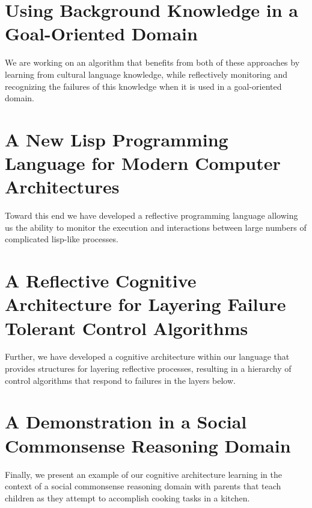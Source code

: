 \section{Using Background Knowledge in a Goal-Oriented Domain}

We are working on an algorithm that benefits from both of these
approaches by learning from cultural language knowledge, while
reflectively monitoring and recognizing the failures of this knowledge
when it is used in a goal-oriented domain.

\section{A New Lisp Programming Language for Modern Computer Architectures}

Toward this end we have developed a reflective programming language
allowing us the ability to monitor the execution and interactions
between large numbers of complicated lisp-like processes.

\section{A Reflective Cognitive Architecture for Layering Failure Tolerant Control Algorithms}

Further, we have developed a cognitive architecture within our
language that provides structures for layering reflective processes,
resulting in a hierarchy of control algorithms that respond to
failures in the layers below.

\section{A Demonstration in a Social Commonsense Reasoning Domain}

Finally, we present an example of our cognitive architecture learning
in the context of a social commonsense reasoning domain with parents
that teach children as they attempt to accomplish cooking tasks in a
kitchen.

